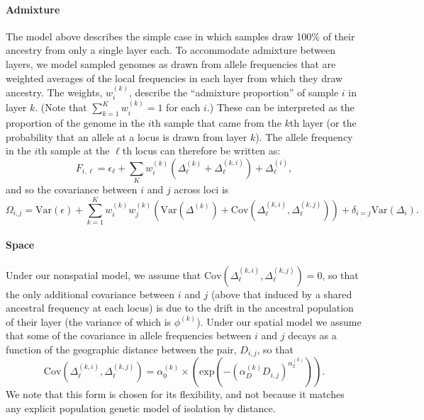 \documentclass[10pt,letterpaper]{article}
\begin{document}
\paragraph{Admixture} 
The model above describes the simple case 
in which samples draw 100\% of their ancestry from only a single layer each. 
To accommodate admixture between layers, 
we model sampled genomes as drawn from
allele frequencies that are weighted averages of the local frequencies in each layer
from which they draw ancestry.
The weights, $w^{(k)}_{i}$, describe the
``admixture proportion'' of sample $i$ in layer $k$.
(Note that $\sum_{k=1}^K w^{(k)}_{i} = 1$ for each $i$.)
These can be interpreted as the proportion of the genome in the $i$th
sample that came from the $k$th layer 
(or the probability that an allele at a locus is drawn from layer $k$).
The allele frequency in the $i$th sample at the $\ell$th locus can therefore be written as:
\begin{equation}
F_{i,\ell} = \epsilon_{\ell} + \sum\limits_{K} w^{(k)}_{i}\left( 
  \Delta^{(k)}_{\ell} + \Delta^{(k,i)}_{\ell}\right) + \Delta^{(i)}_{\ell}	 ,
\label{drift_terms_admix}
\end{equation}
and so the covariance between $i$ and $j$ across loci is
\begin{equation}
\Omega_{i,j} = \text{Var}(\epsilon) + \sum_{k=1}^K w^{(k)}_iw^{(k)}_j
\left(
  \text{Var}\left( \Delta^{(k)} \right) +
\text{Cov}(\Delta^{(k,i)}_{\ell},\Delta^{(k,j)}_{\ell}) 	\right) +
\delta_{i=j} \text{Var}(\Delta_i) .
\label{admixed_spatial_cov}
\end{equation}

\paragraph{Space}
Under our nonspatial model, 
we assume that $\text{Cov}(\Delta^{(k,i)}_{\ell},\Delta^{(k,j)}_{\ell})=0$,
so that the only additional covariance between $i$ and $j$ 
(above that induced by a shared ancestral frequency at each locus)
is due to the drift in the ancestral population of their layer 
(the variance of which is $\phi^{(k)}$). 
Under our spatial model we assume that some of the covariance in allele frequencies
between $i$ and $j$ decays as a function of the geographic distance
between the pair, $D_{i,j}$,
so that 
\begin{equation}
\text{Cov}(\Delta^{(k,i)}_{\ell},\Delta^{(k,j)}_{\ell}) = \alpha^{(k)}_0 \times \left(\text{exp} \left(  -(\alpha^{(k)}_D D_{i,j})^{\alpha^{(k)}_2}\right) \right) .
\end{equation}
We note that this form is chosen for its flexibility, 
and not because it matches any explicit population genetic model of isolation by distance. 
\end{document}
